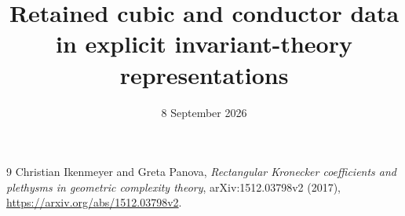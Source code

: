 \documentclass[11pt]{article}
\title{Retained cubic and conductor data in explicit invariant-theory representations}
\author{}
\date{8 September 2026}
\begin{document}
\maketitle

\begin{thebibliography}{9}
Christian Ikenmeyer and Greta Panova,
\emph{Rectangular Kronecker coefficients and plethysms in geometric complexity theory},
arXiv:1512.03798v2 (2017),
\url{https://arxiv.org/abs/1512.03798v2}.
\end{thebibliography}
\end{document}
